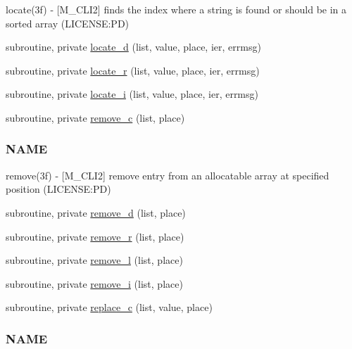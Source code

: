 \begin{DoxyCompactItemize}
\begin{DoxyCompactList}
locate(3f) -\/ \mbox{[}M\+\_\+\+C\+L\+I2\mbox{]} finds the index where a string is found or should be in a sorted array (L\+I\+C\+E\+N\+SE\+:PD) \end{DoxyCompactList}\item 
subroutine, private \mbox{\hyperlink{namespacem__cli2_a0e859cd8635ab617ea9a4e9b4ffca852}{locate\+\_\+d}} (list, value, place, ier, errmsg)
\item 
subroutine, private \mbox{\hyperlink{namespacem__cli2_a2e12eb8c0ae6ce90b821141699e627df}{locate\+\_\+r}} (list, value, place, ier, errmsg)
\item 
subroutine, private \mbox{\hyperlink{namespacem__cli2_a3cc41a1a629f9ab278376a71b243673d}{locate\+\_\+i}} (list, value, place, ier, errmsg)
\item 
subroutine, private \mbox{\hyperlink{namespacem__cli2_a155af513c048d68552ec2e8fb54e1294}{remove\+\_\+c}} (list, place)
\begin{DoxyCompactList}\small\item\em \subsubsection*{N\+A\+ME}

remove(3f) -\/ \mbox{[}M\+\_\+\+C\+L\+I2\mbox{]} remove entry from an allocatable array at specified position (L\+I\+C\+E\+N\+SE\+:PD) \end{DoxyCompactList}\item 
subroutine, private \mbox{\hyperlink{namespacem__cli2_a5deb6a427a39e04c5a18a82497d5cf84}{remove\+\_\+d}} (list, place)
\item 
subroutine, private \mbox{\hyperlink{namespacem__cli2_a281edafaa6f74c30bd8de6d0c1d05be6}{remove\+\_\+r}} (list, place)
\item 
subroutine, private \mbox{\hyperlink{namespacem__cli2_ae3fc38d25a8a4892bde95a7198c2495a}{remove\+\_\+l}} (list, place)
\item 
subroutine, private \mbox{\hyperlink{namespacem__cli2_a1c2bd26b3c04a499cc65b00133dfe6b9}{remove\+\_\+i}} (list, place)
\item 
subroutine, private \mbox{\hyperlink{namespacem__cli2_affd644ac84d1010b40748f80d142d6b3}{replace\+\_\+c}} (list, value, place)
\begin{DoxyCompactList}\small\item\em \subsubsection*{N\+A\+ME}


\end{DoxyCompactList}
\end{DoxyCompactItemize}
